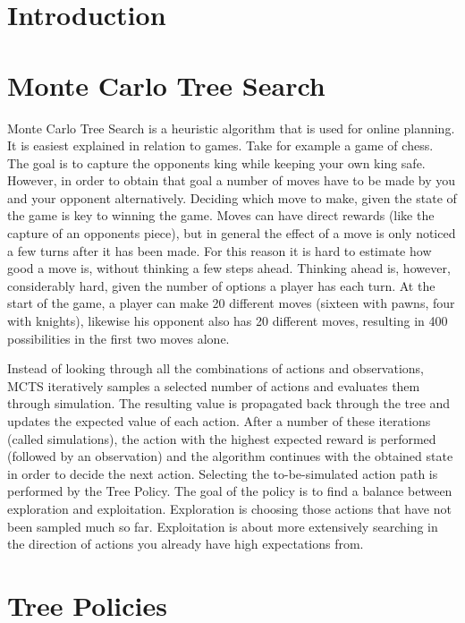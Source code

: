 \documentclass{acm_proc_article-sp}
\begin{document}
\section{Introduction}

\section{Monte Carlo Tree Search}

Monte Carlo Tree Search is a heuristic algorithm that is used for online planning. It is easiest explained in relation to games. Take for example a game of chess. The goal is to capture the opponents king while keeping your own king safe. However, in order to obtain that goal a number of moves have to be made by you and your opponent alternatively. Deciding which move to make, given the state of the game is key to winning the game. Moves can have direct rewards (like the capture of an opponents piece), but in general the effect of a move is only noticed a few turns after it has been made. For this reason it is hard to estimate how good a move is, without thinking a few steps ahead. Thinking ahead is, however, considerably hard, given the number of options a player has each turn. At the start of the game, a player can make 20 different moves (sixteen with pawns, four with knights), likewise his opponent also has 20 different moves, resulting in 400 possibilities in the first two moves alone. %

Instead of looking through all the combinations of actions and observations, MCTS iteratively samples a selected number of actions and evaluates them through simulation. The resulting value is propagated back through the tree and updates the expected value of each action. After a number of these iterations (called simulations), the action with the highest expected reward is performed (followed by an observation) and the algorithm continues with the obtained state in order to decide the next action. Selecting the to-be-simulated action path is performed by the Tree Policy. The goal of the policy is to find a balance between exploration and exploitation. Exploration is choosing those actions that have not been sampled much so far. Exploitation is about more extensively searching in the direction of actions you already have high expectations from. 

\section{Tree Policies} 
\end{document}
